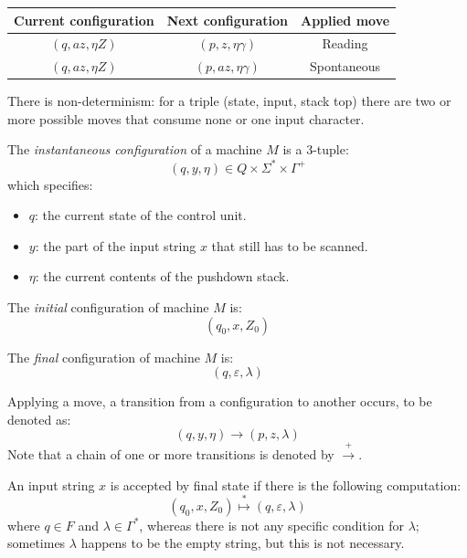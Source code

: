 \begin{table}[H]
    \centering
    \begin{tabular}{ccc}
    \hline
    \textbf{Current configuration} & \textbf{Next configuration} & \textbf{Applied move} \\ \hline
    $(q,az,\eta Z)$                & $(p,z,\eta\gamma)$          & Reading               \\
    $(q,az,\eta Z)$                & $(p,az,\eta\gamma)$         & Spontaneous           \\ \hline
    \end{tabular}
\end{table}

There is non-determinism: for a triple (state, input, stack top) there are two or more possible moves that consume none or one input character. 

\begin{definition}
    The \emph{instantaneous configuration} of a machine $M$ is a 3-tuple: 
    \[(q,y,\eta)\in Q \times \Sigma^{*} \times \Gamma^{+}\]
    which specifies:
    \begin{itemize}
        \item $q$: the current state of the control unit. 
        \item $y$: the part of the input string $x$ that still has to be scanned.
        \item $\eta$: the current contents of the pushdown stack.
    \end{itemize}

    The \emph{initial} configuration of machine $M$ is: 
    \[(q_0,x,Z_0)\]

    The \emph{final} configuration of machine $M$ is: 
    \[(q,\varepsilon,\lambda)\]
\end{definition}

Applying a move, a transition from a configuration to another occurs, to be denoted as: 
\[(q,y,\eta)\rightarrow(p,z,\lambda)\]
Note that a chain of one or more transitions is denoted by $\overset{+}{\rightarrow}$. 

An input string $x$ is accepted by final state if there is the following computation:
\[(q_0,x,Z_0)\overset{*}{\mapsto}(q,\varepsilon,\lambda)\]
where $q \in F$ and $\lambda\in\Gamma^{*}$, whereas there is not any specific condition for $\lambda$; sometimes $\lambda$ happens to be the empty string, but this is not necessary. 

